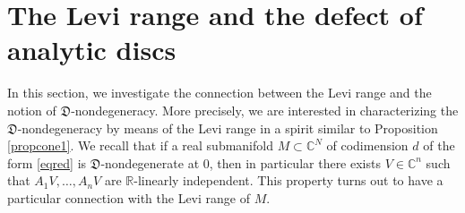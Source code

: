 \documentclass[10pt,a4paper]{amsart}
\newcommand{\C}{\mathbb C}
\newcommand{\R}{\mathbb R}
\numberwithin{equation}{section}
\begin{document}
\section{The Levi range and the defect of analytic discs}\label{sec2}

In this section, we investigate the connection between the Levi range and the notion of $\mathfrak{D}$-nondegeneracy. More precisely, we are interested in characterizing the $\mathfrak{D}$-nondegeneracy by means of the Levi range in a spirit similar to Proposition \ref{propcone1}. We recall that if a real submanifold $M \subset \C^N$ of codimension $d$ of the form \eqref{eqred} is  $\mathfrak{D}$-nondegenerate at $0$, then in particular there exists $V \in \C^n$ such that $A_1V,\ldots,A_nV$ are $\R$-linearly independent. This property turns out to have a particular connection with the Levi range of $M$.    
\end{document}
